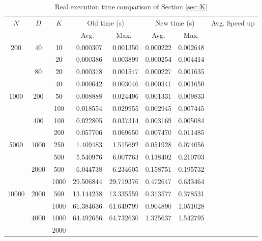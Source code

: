 \documentclass{article}
\begin{document}
\begin{table}[!h]
  \centering
  \small
  \caption{Real execution time comparison of Section \ref{sec::K}}
  \label{tbl::realtime2}
  \begin{tabular}{cccrrrrr}
    \toprule
      \multirow{2}{*}{$N$} & \multirow{2}{*}{$D$} & \multirow{2}{*}{$K$} & \multicolumn{2}{c}{Old time (s)} & \multicolumn{2}{c}{New time (s)} & \multirow{2}{*}{Avg. Speed up} \\ \cmidrule(lr){4-5} \cmidrule(lr){6-7}
      & & & \multicolumn{1}{c}{Avg.} & \multicolumn{1}{c}{Max.} & \multicolumn{1}{c}{Avg.} & \multicolumn{1}{c}{Max.} \\
    \midrule
    \multirow{4}{*}{200} & \multirow{2}{*}{40} & 10 & 0.000307 & 0.001350 & 0.000222 & 0.002648 &
    \\
    & & 20 & 0.000386 & 0.003899 & 0.000254 & 0.004414 &
    \\
    & \multirow{2}{*}{80} & 20 & 0.000378 & 0.001547 & 0.000227 & 0.001635 & 
    \\
    & & 40 & 0.000642 & 0.003046 & 0.000341 & 0.001650 &
    \\
    \multirow{4}{*}{1000} & \multirow{2}{*}{200} & 50 & 0.008888 & 0.024496 & 0.001331 & 0.009833 &
    \\
    & & 100 & 0.018554 & 0.029955 & 0.002945 & 0.007445 &
    \\
    & \multirow{2}{*}{400} & 100 & 0.022805 & 0.037314 & 0.003169 & 0.005084 & 
    \\
    & & 200 & 0.057706 & 0.069650 & 0.007470 & 0.011485 &
    \\
    \multirow{4}{*}{5000} & \multirow{2}{*}{1000} & 250 & 1.409483 & 1.515692 & 0.051928 & 0.074056 &
    \\
    & & 500 & 5.540976 & 6.007763 & 0.138402 & 0.210703 &
    \\
    & \multirow{2}{*}{2000} & 500 & 6.044738 & 6.234605 & 0.158751 & 0.195732 & 
    \\
    & & 1000 & 29.506844 & 29.719376 & 0.472647 & 0.633464 &
    \\
    \multirow{4}{*}{10000} & \multirow{2}{*}{2000} & 500 & 13.144238 & 13.335559 & 0.313577 & 0.378531 &
    \\
    & & 1000 & 61.384636 & 61.649799 & 0.904890 & 1.051028 &
    \\
    & \multirow{2}{*}{4000} & 1000 & 64.492656 & 64.732630 & 1.325637 & 1.542795 & 
    \\
    & & 2000 &  &  &  &  &
    \\
    \bottomrule
  \end{tabular}
\end{table}
\end{document}
